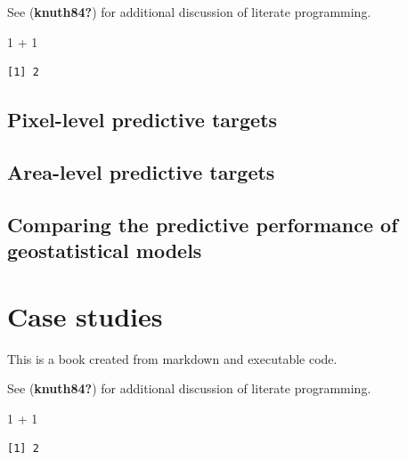 \documentclass[
  letterpaper,
]{krantz}
\newenvironment{Shaded}{\begin{snugshade}}{\end{snugshade}}
\newcommand{\DecValTok}[1]{\textcolor[rgb]{0.68,0.00,0.00}{#1}}
\newcommand{\SpecialCharTok}[1]{\textcolor[rgb]{0.37,0.37,0.37}{#1}}
\begin{document}
See (\textbf{knuth84?}) for additional discussion of literate
programming.

\begin{Shaded}
\begin{Highlighting}[]
\DecValTok{1} \SpecialCharTok{+} \DecValTok{1}
\end{Highlighting}
\end{Shaded}

\begin{verbatim}
[1] 2
\end{verbatim}

\hypertarget{pixel-level-predictive-targets}{%
\section{Pixel-level predictive
targets}\label{pixel-level-predictive-targets}}

\hypertarget{area-level-predictive-targets}{%
\section{Area-level predictive
targets}\label{area-level-predictive-targets}}

\hypertarget{comparing-the-predictive-performance-of-geostatistical-models}{%
\section{Comparing the predictive performance of geostatistical
models}\label{comparing-the-predictive-performance-of-geostatistical-models}}


\hypertarget{case-studies}{%
\chapter{Case studies}\label{case-studies}}

This is a book created from markdown and executable code.

See (\textbf{knuth84?}) for additional discussion of literate
programming.

\begin{Shaded}
\begin{Highlighting}[]
\DecValTok{1} \SpecialCharTok{+} \DecValTok{1}
\end{Highlighting}
\end{Shaded}

\begin{verbatim}
[1] 2
\end{verbatim}
\end{document}
